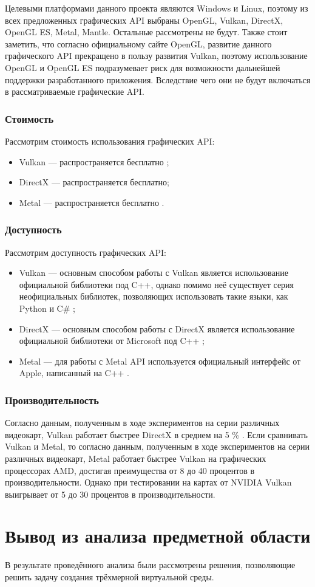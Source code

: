 Целевыми платформами данного проекта являются Windows и Linux, поэтому из всех предложенных графических API выбраны OpenGL, Vulkan, DirectX, OpenGL ES, Metal, Mantle. Остальные рассмотрены не будут. Также стоит заметить, что согласно официальному сайте OpenGL, развитие данного графического API прекращено в пользу развития Vulkan, поэтому использование OpenGL и OpenGL ES подразумевает риск для возможности дальнейшей поддержки разработанного приложения. Вследствие чего они не будут включаться в рассматриваемые графические API.

\subsubsection{Стоимость}
Рассмотрим стоимость использования графических API:
\begin{itemize}
\item Vulkan --- распространяется бесплатно \cite{vulkan};
\item DirectX --- распространяется бесплатно\cite{direct};
\item Metal --- распространяется бесплатно \cite{metal}.
\end{itemize}

\subsubsection{Доступность}
Рассмотрим доступность графических API:
\begin{itemize}
\item Vulkan --- основным способом работы с Vulkan является использование официальной библиотеки под C++, однако помимо неё существует серия неофициальных библиотек, позволяющих использовать такие языки, как Python и C\# \cite{vulkan};
\item DirectX --- основным способом работы с DirectX является использование официальной библиотеки от Microsoft под C++ \cite{direct};
\item Metal --- для работы с Metal API используется официальный интерфейс от Apple, написанный на C++ \cite{metal}.
\end{itemize}

\subsubsection{Производительность}
Согласно данным, полученным в ходе экспериментов на серии различных видеокарт, Vulkan работает быстрее DirectX в среднем на 5 \% \cite{prod}. Если сравнивать Vulkan и Metal, то согласно данным, полученным в ходе экспериментов на серии различных видеокарт, Metal работает быстрее Vulkan на графических процессорах AMD, достигая преимущества от 8 до 40 процентов в производительности. Однако при тестировании на картах от NVIDIA Vulkan выигрывает от 5 до 30 процентов в производительности.

\section{Вывод из анализа предметной области}
В результате проведённого анализа были рассмотрены решения, позволяющие решить задачу создания трёхмерной виртуальной среды.